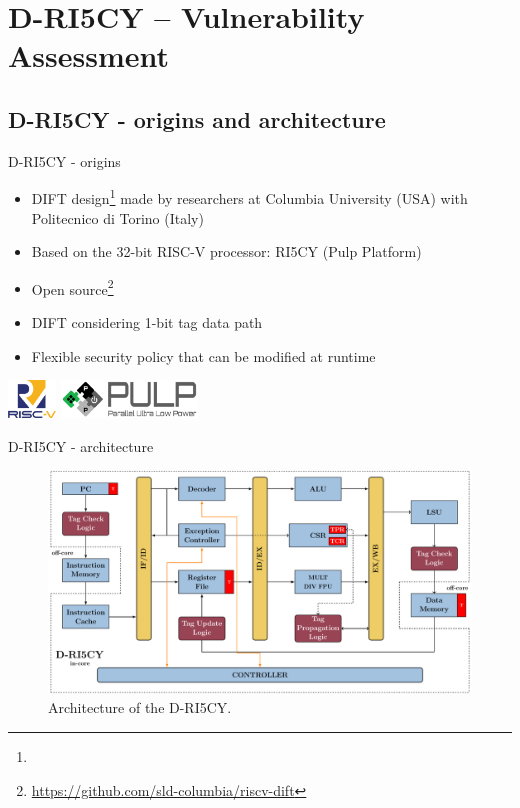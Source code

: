 \section{D-RI5CY -- Vulnerability Assessment}

\subsection{D-RI5CY - origins and architecture}
\begin{frame}{D-RI5CY - origins}
    \begin{itemize}
        \item DIFT design\footnote[frame]{\tiny{}} made by researchers at Columbia University (USA) with Politecnico di Torino (Italy)
        \item Based on the 32-bit RISC-V processor: RI5CY (Pulp Platform)
        \item Open source\footnote{\tiny\url{https://github.com/sld-columbia/riscv-dift}}
        \item DIFT considering 1-bit tag data path
        \item Flexible security policy that can be modified at runtime
    \end{itemize}

    \centering
    \vfill
    \includegraphics[height=1cm]{img/logo/riscv.png}
    \hspace{1cm}
    \includegraphics[height=1cm]{img/logo/pulp_logo.pdf}
    \vfill
\end{frame}
\begin{frame}{D-RI5CY - architecture}
    \begin{figure}
        \centering
        \includegraphics[width=.9\textwidth]{src/2_vuln_assessment/img/RI5CY.pdf}
        \caption{Architecture of the D-RI5CY.}
        \label{fig:riscy}
    \end{figure}
\end{frame}
